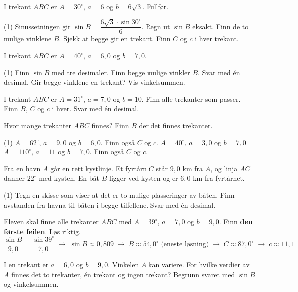 I trekant $ABC$ er $A = 30^\circ$, $a = 6$ og $b = 6\sqrt3$. Fullfør.
\begin{tasks}(1)
  \task Sinussetningen gir $\sin B = \dfrac{6\sqrt3 \cdot \sin 30^\circ}{6}$. Regn ut $\sin B$ eksakt.
  \task Finn de to mulige vinklene $B$.
  \task Sjekk at begge gir en trekant. Finn $C$ og $c$ i hver trekant.
\end{tasks}

I trekant $ABC$ er $A = 40^\circ$, $a = 6,0$ og $b = 7,0$.
\begin{tasks}(1)
  \task Finn $\sin B$ med tre desimaler.
  \task Finn begge mulige vinkler $B$. Svar med én desimal.
  \task Gir begge vinklene en trekant? Vis vinkelsummen.
\end{tasks}


I trekant $ABC$ er $A = 31^\circ$, $a = 7,0$ og $b = 10$. Finn alle trekanter som passer.
Finn $B$, $C$ og $c$ i hver. Svar med én desimal.

Hvor mange trekanter $ABC$ finnes? Finn $B$ der det finnes trekanter.
\begin{tasks}(1)
  \task $A = 62^\circ$, $a = 9,0$ og $b = 6,0$. Finn også $C$ og $c$.
  \task $A = 40^\circ$, $a = 3,0$ og $b = 7,0$
  \task $A = 110^\circ$, $a = 11$ og $b = 7,0$. Finn også $C$ og $c$.
\end{tasks}

Fra en havn $A$ går en rett kystlinje. Et fyrtårn $C$ står $9,0$ km fra $A$, og linja $AC$ danner $22^\circ$ med kysten.
En båt $B$ ligger ved kysten og er $6,0$ km fra fyrtårnet.
\begin{tasks}(1)
  \task Tegn en skisse som viser at det er to mulige plasseringer av båten.
  \task Finn avstanden fra havna til båten i begge tilfellene. Svar med én desimal.
\end{tasks}

Eleven skal finne alle trekanter $ABC$ med $A = 39^\circ$, $a = 7,0$ og $b = 9,0$. Finn \textbf{den første feilen}. Løs riktig.
\[ \frac{\sin B}{9,0} = \frac{\sin 39^\circ}{7,0} \;\longrightarrow\; \sin B \approx 0,809 \;\longrightarrow\; B \approx 54,0^\circ \text{ (eneste løsning)} \;\longrightarrow\; C \approx 87,0^\circ \;\longrightarrow\; c \approx 11,1 \]


I en trekant er $a = 6,0$ og $b = 9,0$. Vinkelen $A$ kan variere.
For hvilke verdier av $A$ finnes det to trekanter, én trekant og ingen trekant?
Begrunn svaret med $\sin B$ og vinkelsummen.

